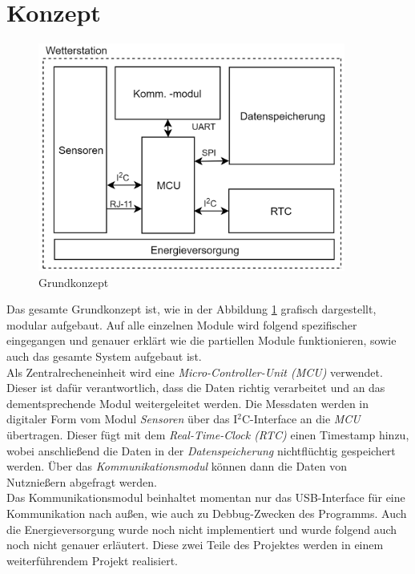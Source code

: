 \section{Konzept}

\begin{figure}[hbtp]
\centering
\includegraphics[width=0.9\textwidth]{graphics/Konzeptdiagramme/Grundkonzept.PNG}
\caption{Grundkonzept}
\label{fig:grundkonzept}
\end{figure}


Das gesamte Grundkonzept ist, wie in der Abbildung \ref{fig:grundkonzept} grafisch dargestellt, modular aufgebaut. Auf alle einzelnen Module wird folgend spezifischer eingegangen und genauer erklärt wie die partiellen Module funktionieren, sowie auch das gesamte System aufgebaut ist.\\

Als Zentralrecheneinheit wird eine \textit{Micro-Controller-Unit (MCU)} verwendet. Dieser ist dafür verantwortlich, dass die Daten richtig verarbeitet und an das dementsprechende Modul weitergeleitet werden. Die Messdaten werden in digitaler Form vom Modul \textit{Sensoren} über das I$^{2}$C-Interface an die \textit{MCU} übertragen. Dieser fügt mit dem \textit{Real-Time-Clock (RTC)} einen Timestamp hinzu, wobei anschließend die Daten in der \textit{Datenspeicherung} nichtflüchtig gespeichert werden. Über das \textit{Kommunikationsmodul} können dann die Daten von Nutznießern abgefragt werden.\\

Das Kommunikationsmodul beinhaltet momentan nur das USB-Interface für eine Kommunikation nach außen, wie auch zu Debbug-Zwecken des Programms. Auch die Energieversorgung wurde noch nicht implementiert und wurde folgend auch noch nicht genauer erläutert. Diese zwei Teile des Projektes werden in einem weiterführendem Projekt realisiert.\\

